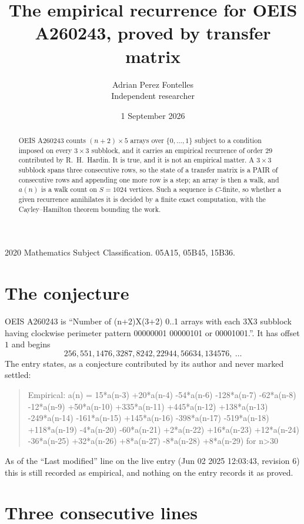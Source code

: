 \documentclass[11pt,a4paper]{article}
\title{The empirical recurrence for OEIS A260243, proved by transfer matrix}
\author{Adrian Perez Fontelles\\ \small Independent researcher}
\date{1 September 2026}
\theoremstyle{plain}
\theoremstyle{definition}
\begin{document}
\maketitle

\begin{abstract}
OEIS A260243 counts $(n+2)\times5$ arrays over $\{0,\dots,1\}$ subject to a condition imposed on
every $3\times3$ subblock, and it carries an empirical recurrence of order $29$
contributed by R.~H.~Hardin. It is true, and it is not an empirical matter. A $3\times3$
subblock spans three consecutive rows, so the state of a transfer matrix is a PAIR of
consecutive rows and appending one more row is a step; an array is then a walk, and
$a(n)$ is a walk count on $S=1024$ vertices. Such a sequence is $C$-finite, so whether a given
recurrence annihilates it is decided by a finite exact computation, with the Cayley--Hamilton
theorem bounding the work.
\end{abstract}

\noindent\small 2020 Mathematics Subject Classification. 05A15, 05B45, 15B36.\normalsize

\section{The conjecture}

OEIS A260243 is ``Number of (n+2)X(3+2) 0..1 arrays with each 3X3 subblock having clockwise perimeter pattern 00000001 00000101 or 00001001.''. It has offset $1$ and begins
\[
256, 551, 1476, 3287, 8242, 22944, 56634, 134576,\ \dots
\]
The entry states, as a conjecture contributed by its author and never marked settled:
\begin{quote}
Empirical: a(n) = 15*a(n-3) +20*a(n-4) -54*a(n-6) -128*a(n-7) -62*a(n-8) -12*a(n-9) +50*a(n-10) +335*a(n-11) +445*a(n-12) +138*a(n-13) -249*a(n-14) -161*a(n-15) +145*a(n-16) -398*a(n-17) -519*a(n-18) +118*a(n-19) -4*a(n-20) -60*a(n-21) +2*a(n-22) +16*a(n-23) +12*a(n-24) -36*a(n-25) +32*a(n-26) +8*a(n-27) -8*a(n-28) +8*a(n-29) for n>30
\end{quote}
As of the ``Last modified'' line on the live entry (Jun 02 2025 12:03:43, revision 6) this is still
recorded as empirical, and nothing on the entry records it as proved.

\section{Three consecutive lines}
\end{document}
